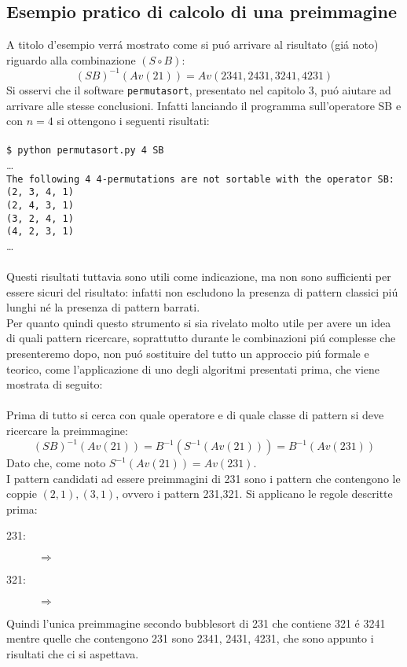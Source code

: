 \subsection*{Esempio pratico di calcolo di una preimmagine}
A titolo d'esempio verr\'a mostrato come si pu\'o arrivare al risultato (gi\'a noto) riguardo alla combinazione $(S\circ B)$:
$$(SB)^{-1}(Av(21)) = Av(2341, 2431, 3241, 4231)$$
Si osservi che il software \texttt{permutasort}, presentato nel capitolo 3, pu\'o aiutare ad arrivare alle stesse conclusioni. Infatti lanciando il programma sull'operatore SB e con $n=4$ si ottengono i seguenti risultati:\\\\
\texttt{\$ python permutasort.py 4 SB }\\\dots\\\texttt{The following 4 4-permutations are not sortable with the operator SB:}\\\texttt{(2, 3, 4, 1)}\\\texttt{(2, 4, 3, 1)}\\\texttt{(3, 2, 4, 1)}\\\texttt{(4, 2, 3, 1)}\\\dots\\\\
Questi risultati tuttavia sono utili come indicazione, ma non sono sufficienti per essere sicuri del risultato: infatti non escludono la presenza di pattern classici pi\'u lunghi n\'e la presenza di pattern barrati.\\
Per quanto quindi questo strumento si sia rivelato molto utile per avere un idea di quali pattern ricercare, soprattutto durante le combinazioni pi\'u complesse che presenteremo dopo, non pu\'o sostituire del tutto un approccio pi\'u formale e teorico, come l'applicazione di uno degli algoritmi presentati prima, che viene mostrata di seguito:\\\\ 
Prima di tutto si cerca con quale operatore e di quale classe di pattern si deve ricercare la preimmagine:
$$(SB)^{-1}(Av(21)) = B^{-1}(S^{-1}(Av(21)))=B^{-1}(Av(231))$$
Dato che, come noto $S^{-1}(Av(21))=Av(231)$.\\I pattern candidati ad essere preimmagini di 231 sono i pattern che contengono le coppie $(2,1),(3,1)$, ovvero i pattern 231,321. Si applicano le regole descritte prima:
\begin{description}
	\item[231:]\begin{center}
	$\Rightarrow$
	\end{center}
	\item[321:] \begin{center}
		$\Rightarrow$
	\end{center}
\end{description}
Quindi l'unica preimmagine secondo bubblesort di 231 che contiene 321 \'e 3241 mentre quelle che contengono 231 sono 2341, 2431, 4231, che sono appunto i risultati che ci si aspettava.
